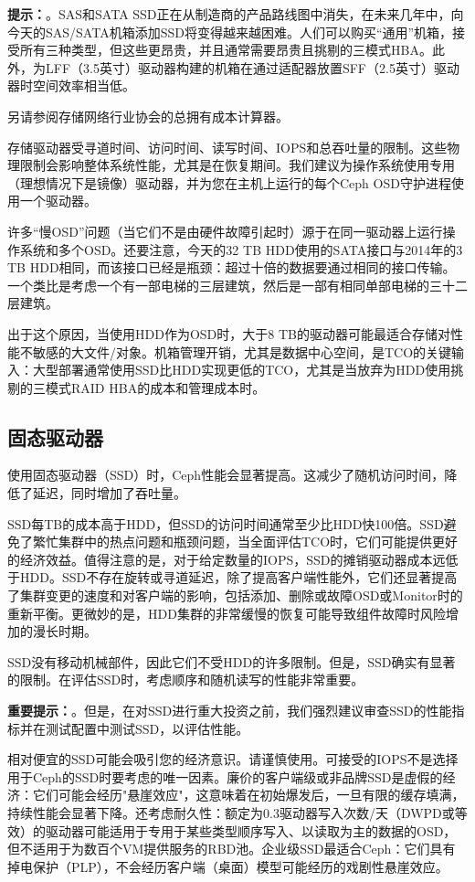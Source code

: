 \documentclass[12pt,UTF8]{ctexbook}
\begin{document}
\textbf{提示：}。SAS和SATA SSD正在从制造商的产品路线图中消失，在未来几年中，向今天的SAS/SATA机箱添加SSD将变得越来越困难。人们可以购买“通用”机箱，接受所有三种类型，但这些更昂贵，并且通常需要昂贵且挑剔的三模式HBA。此外，为LFF（3.5英寸）驱动器构建的机箱在通过适配器放置SFF（2.5英寸）驱动器时空间效率相当低。

另请参阅存储网络行业协会的总拥有成本计算器。

存储驱动器受寻道时间、访问时间、读写时间、IOPS和总吞吐量的限制。这些物理限制会影响整体系统性能，尤其是在恢复期间。我们建议为操作系统使用专用（理想情况下是镜像）驱动器，并为您在主机上运行的每个Ceph OSD守护进程使用一个驱动器。

许多“慢OSD”问题（当它们不是由硬件故障引起时）源于在同一驱动器上运行操作系统和多个OSD。还要注意，今天的32 TB HDD使用的SATA接口与2014年的3 TB HDD相同，而该接口已经是瓶颈：超过十倍的数据要通过相同的接口传输。一个类比是考虑一个有一部电梯的三层建筑，然后是一部有相同单部电梯的三十二层建筑。

出于这个原因，当使用HDD作为OSD时，大于8 TB的驱动器可能最适合存储对性能不敏感的大文件/对象。机箱管理开销，尤其是数据中心空间，是TCO的关键输入：大型部署通常使用SSD比HDD实现更低的TCO，尤其是当放弃为HDD使用挑剔的三模式RAID HBA的成本和管理成本时。

\subsection{固态驱动器}
使用固态驱动器（SSD）时，Ceph性能会显著提高。这减少了随机访问时间，降低了延迟，同时增加了吞吐量。

SSD每TB的成本高于HDD，但SSD的访问时间通常至少比HDD快100倍。SSD避免了繁忙集群中的热点问题和瓶颈问题，当全面评估TCO时，它们可能提供更好的经济效益。值得注意的是，对于给定数量的IOPS，SSD的摊销驱动器成本远低于HDD。SSD不存在旋转或寻道延迟，除了提高客户端性能外，它们还显著提高了集群变更的速度和对客户端的影响，包括添加、删除或故障OSD或Monitor时的重新平衡。更微妙的是，HDD集群的非常缓慢的恢复可能导致组件故障时风险增加的漫长时期。

SSD没有移动机械部件，因此它们不受HDD的许多限制。但是，SSD确实有显著的限制。在评估SSD时，考虑顺序和随机读写的性能非常重要。

\textbf{重要提示：}。但是，在对SSD进行重大投资之前，我们强烈建议审查SSD的性能指标并在测试配置中测试SSD，以评估性能。

相对便宜的SSD可能会吸引您的经济意识。请谨慎使用。可接受的IOPS不是选择用于Ceph的SSD时要考虑的唯一因素。廉价的客户端级或非品牌SSD是虚假的经济：它们可能会经历"悬崖效应"，这意味着在初始爆发后，一旦有限的缓存填满，持续性能会显著下降。还考虑耐久性：额定为0.3驱动器写入次数/天（DWPD或等效）的驱动器可能适用于专用于某些类型顺序写入、以读取为主的数据的OSD，但不适用于为数百个VM提供服务的RBD池。企业级SSD最适合Ceph：它们具有掉电保护（PLP），不会经历客户端（桌面）模型可能经历的戏剧性悬崖效应。
\end{document}
